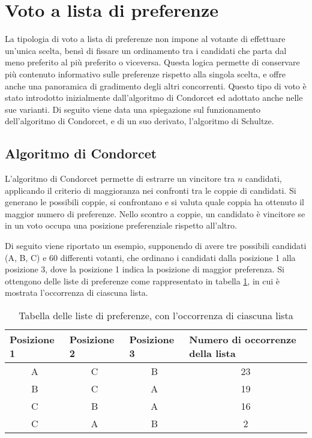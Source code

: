 \documentclass[12pt,a4paper,openright,twoside]{book}
\begin{document}
\section{Voto a lista di preferenze}
La tipologia di voto a lista di preferenze non impone al votante di effettuare un'unica scelta,
bensì di fissare un ordinamento tra i candidati che parta dal meno preferito al più preferito
o viceversa. Questa logica permette di conservare più contenuto informativo sulle preferenze
rispetto alla singola scelta, e offre anche una panoramica di gradimento degli altri concorrenti.
Questo tipo di voto è stato introdotto inizialmente dall'algoritmo di Condorcet ed adottato
anche nelle sue varianti. Di seguito viene data una spiegazione sul funzionamento dell'algoritmo
di Condorcet, e di un suo derivato, l'algoritmo di Schultze.
\subsection{Algoritmo di Condorcet}
L'algoritmo di Condorcet permette di estrarre un vincitore tra ${n}$ candidati,
applicando il criterio di maggioranza nei confronti tra le coppie di candidati.
Si generano le possibili coppie, si confrontano e si valuta quale coppia ha ottenuto il
maggior numero di preferenze. Nello scontro a coppie, un candidato è vincitore se in un
voto occupa una posizione preferenziale rispetto all'altro.

Di seguito viene riportato un esempio, supponendo di avere tre possibili candidati (A, B, C)
e 60 differenti votanti, che ordinano i candidati dalla posizione 1 alla posizione 3, dove la posizione 1 
indica la posizione di maggior preferenza.
Si ottengono delle liste di preferenze come rappresentato in tabella \ref{table:voticondorcet}, in cui
è mostrata l'occorrenza di ciascuna lista.

\begin{table}[H]
    \centering
    \begin{tabular}{|c|c|c|c|}
    \hline
    \multicolumn{1}{|l|}{Posizione 1} & \multicolumn{1}{|l|}{Posizione 2} & \multicolumn{1}{|l|}{Posizione 3} & \multicolumn{1}{l|}{Numero di occorrenze della lista } \\ \hline
    A & C & B & 23                              \\ \hline
    B & C & A & 19                              \\ \hline
    C & B & A & 16                              \\ \hline
    C & A & B & 2                               \\ \hline
    \end{tabular}
    \caption{Tabella delle liste di preferenze, con l'occorrenza di ciascuna lista}
    \label{table:voticondorcet}
\end{table}
\end{document}
